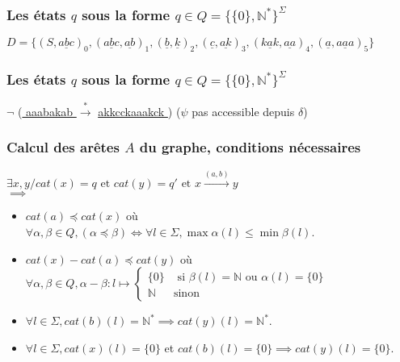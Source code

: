 \documentclass[12pt]{beamer}
\begin{document}
\begin{frame}\frametitle{Les états $q$ sous la forme $q \in Q = \{\{0\},\mathbb{N}^*\}^{\Sigma}$}

$D = \{(S,\underline{ abc })_0,(\underline{ abc },\underline{ ab })_1,(\underline{ b },\underline{ k })_2,(\underline{ c },\underline{ ak })_3,(\underline{ kak },\underline{ aa })_4,(\underline{ a },\underline{ aaa })_5\}$

\begin{figure}
    \centering
    \qquad
\end{figure}

\end{frame}

\begin{frame}\frametitle{Les états $q$ sous la forme $q \in Q = \{\{0\},\mathbb{N}^*\}^{\Sigma}$}


$\neg$ (\underline{ aaabakab } $\overset{*}{\rightarrow}$ \underline{ akkcckaaakck }) ($\psi$ pas accessible depuis $\delta$)

\end{frame}

\begin{frame}\frametitle{Calcul des arêtes $A$ du graphe, conditions nécessaires}
$\exists x,y / cat(x) = q \text{ et } cat(y) = q' \text { et } x \overset{(a,b)}{\rightarrow} y$\\
$\implies$
\begin{itemize}
\item $cat(a) \preceq cat(x)$ où\\ $\forall \alpha, \beta \in Q, (\alpha \preceq \beta) \iff \forall l \in \Sigma, \max \alpha(l) \leq \min \beta(l)$.
\pause

\item $cat(x)-cat(a) \preceq cat(y)$ où\\ $\forall \alpha,\beta \in Q, \alpha-\beta : l \mapsto 
\begin{cases}
\{0\} & \text { si } \beta(l) = \mathbb{N} \text{ ou }\alpha(l) = \{0\}\\
\mathbb{N} & \text{sinon}
\end{cases}
$
\pause

\item $\forall l \in \Sigma, cat(b)(l) = \mathbb{N}^* \implies cat(y)(l) = \mathbb{N}^*$. 
\pause

\item $\forall l \in \Sigma, cat(x)(l) = \{0\}$ et $cat(b)(l) = \{0\} \implies cat(y)(l) = \{0\}$.

\end{itemize}

\end{frame}
\end{document}
